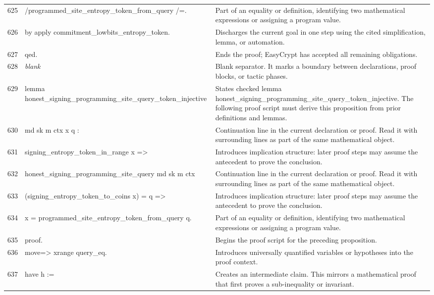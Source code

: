 \documentclass[10pt]{article}
\begin{document}
\begin{longtable}{r L{0.53\textwidth} L{0.37\textwidth}}
625 & {\ttfamily\scriptsize         /programmed\_site\_entropy\_token\_from\_query /=.} & Part of an equality or definition, identifying two mathematical expressions or assigning a program value. \\
626 & {\ttfamily\scriptsize by apply commitment\_lowbits\_entropy\_token.} & Discharges the current goal in one step using the cited simplification, lemma, or automation. \\
627 & {\ttfamily\scriptsize qed.} & Ends the proof; EasyCrypt has accepted all remaining obligations. \\
628 & {\ttfamily\scriptsize \emph{blank}} & Blank separator.  It marks a boundary between declarations, proof blocks, or tactic phases. \\
629 & {\ttfamily\scriptsize lemma honest\_signing\_programming\_site\_query\_token\_injective} & States checked lemma honest\_signing\_programming\_site\_query\_token\_injective.  The following proof script must derive this proposition from prior definitions and lemmas. \\
630 & {\ttfamily\scriptsize   md sk m ctx x q :} & Continuation line in the current declaration or proof.  Read it with surrounding lines as part of the same mathematical object. \\
631 & {\ttfamily\scriptsize   signing\_entropy\_token\_in\_range x =>} & Introduces implication structure: later proof steps may assume the antecedent to prove the conclusion. \\
632 & {\ttfamily\scriptsize   honest\_signing\_programming\_site\_query md sk m ctx} & Continuation line in the current declaration or proof.  Read it with surrounding lines as part of the same mathematical object. \\
633 & {\ttfamily\scriptsize     (signing\_entropy\_token\_to\_coins x) = q =>} & Introduces implication structure: later proof steps may assume the antecedent to prove the conclusion. \\
634 & {\ttfamily\scriptsize   x = programmed\_site\_entropy\_token\_from\_query q.} & Part of an equality or definition, identifying two mathematical expressions or assigning a program value. \\
635 & {\ttfamily\scriptsize proof.} & Begins the proof script for the preceding proposition. \\
636 & {\ttfamily\scriptsize move=> xrange query\_eq.} & Introduces universally quantified variables or hypotheses into the proof context. \\
637 & {\ttfamily\scriptsize have h :=} & Creates an intermediate claim.  This mirrors a mathematical proof that first proves a sub-inequality or invariant. \\

\end{longtable}
\end{document}
